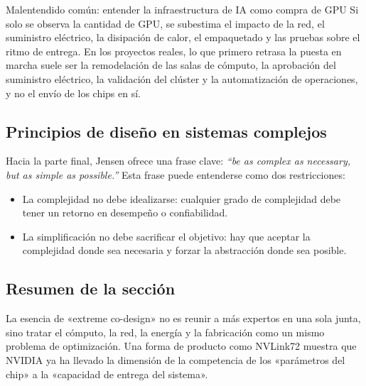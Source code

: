 \begin{warningbox}{Malentendido común: entender la infraestructura de IA como compra de GPU}
Si solo se observa la cantidad de GPU, se subestima el impacto de la red, el suministro eléctrico, la disipación de calor, el empaquetado y las pruebas sobre el ritmo de entrega. En los proyectos reales, lo que primero retrasa la puesta en marcha suele ser la remodelación de las salas de cómputo, la aprobación del suministro eléctrico, la validación del clúster y la automatización de operaciones, y no el envío de los chips en sí.
\end{warningbox}

\subsection{Principios de diseño en sistemas complejos}

Hacia la parte final, Jensen ofrece una frase clave: \textit{``be as complex as necessary, but as simple as possible.''} Esta frase puede entenderse como dos restricciones:
\begin{itemize}
    \item La complejidad no debe idealizarse: cualquier grado de complejidad debe tener un retorno en desempeño o confiabilidad.
    \item La simplificación no debe sacrificar el objetivo: hay que aceptar la complejidad donde sea necesaria y forzar la abstracción donde sea posible.
\end{itemize}

\subsection{Resumen de la sección}

La esencia de «extreme co-design» no es reunir a más expertos en una sola junta, sino tratar el cómputo, la red, la energía y la fabricación como un mismo problema de optimización. Una forma de producto como NVLink72 muestra que NVIDIA ya ha llevado la dimensión de la competencia de los «parámetros del chip» a la «capacidad de entrega del sistema».


